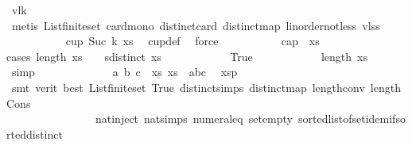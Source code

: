 \begin{isabellebody}
\ v{}l{\isacharunderscore}{\kern0pt}k\isanewline
\ \ \ \ \ \ \ \ \ \ \isamarkupfalse%
\ {\isacharparenleft}{\kern0pt}metis\ List{\isachardot}{\kern0pt}finite{\isacharunderscore}{\kern0pt}set\ card{\isacharunderscore}{\kern0pt}mono\ distinct{\isacharunderscore}{\kern0pt}card\ distinct{\isacharunderscore}{\kern0pt}map\ linorder{\isacharunderscore}{\kern0pt}not{\isacharunderscore}{\kern0pt}less\ v{}l{\isacharunderscore}{\kern0pt}ss{\isacharparenright}{\kern0pt}\isanewline
\ \ \ \ \ \ \ \ \isamarkupfalse%
\ {}{\isacharcolon}{\kern0pt}{\isachardoublequoteopen}{\isasymnot}\ cup\ {\isacharparenleft}{\kern0pt}Suc\ k{\isacharparenright}{\kern0pt}\ xs{\isachardoublequoteclose}\ \isamarkupfalse%
\ cup{\isacharunderscore}{\kern0pt}def\ \isamarkupfalse%
\ force\isanewline
\ \ \ \ \ \ \ \ \isamarkupfalse%
\ {\isachardoublequoteopen}{\isasymnot}\ cap\ {}\ xs{\isachardoublequoteclose}\isanewline
\ \ \ \ \ \ \ \ \isamarkupfalse%
{\isacharparenleft}{\kern0pt}cases\ {\isachardoublequoteopen}length\ xs\ {\isacharequal}{\kern0pt}\ {}\ {\isasymand}\ sdistinct\ xs{\isachardoublequoteclose}{\isacharparenright}{\kern0pt}\isanewline
\ \ \ \ \ \ \ \ \ \ \isamarkupfalse%
\ True\isanewline
\ \ \ \ \ \ \ \ \ \ \isamarkupfalse%
\ {\isachardoublequoteopen}length\ xs\ {\isacharequal}{\kern0pt}\ {}{\isachardoublequoteclose}\ \isamarkupfalse%
\ simp\isanewline
\ \ \ \ \ \ \ \ \ \ \isamarkupfalse%
\ \isamarkupfalse%
\ a\ b\ c\ \ xs{}{\isacharcolon}{\kern0pt}\ {\isachardoublequoteopen}xs\ {\isacharequal}{\kern0pt}\ {\isacharbrackleft}{\kern0pt}a{\isacharcomma}{\kern0pt}b{\isacharcomma}{\kern0pt}c{\isacharbrackright}{\kern0pt}{\isachardoublequoteclose}\ \isamarkupfalse%
\ xsp\isanewline
\ \ \ \ \ \ \ \ \ \ \ \ \isamarkupfalse%
\ {\isacharparenleft}{\kern0pt}smt\ {\isacharparenleft}{\kern0pt}verit{\isacharcomma}{\kern0pt}\ best{\isacharparenright}{\kern0pt}\ List{\isachardot}{\kern0pt}finite{\isacharunderscore}{\kern0pt}set\ True\ distinct{\isachardot}{\kern0pt}simps{\isacharparenleft}{\kern0pt}{}{\isacharparenright}{\kern0pt}\ distinct{\isacharunderscore}{\kern0pt}map\ length{\isacharunderscore}{\kern0pt}{}{\isacharunderscore}{\kern0pt}conv\ length{\isacharunderscore}{\kern0pt}Cons\isanewline
\ \ \ \ \ \ \ \ \ \ \ \ \ \ \ \ nat{\isachardot}{\kern0pt}inject\ nat{\isachardot}{\kern0pt}simps{\isacharparenleft}{\kern0pt}{}{\isacharparenright}{\kern0pt}\ numeral{\isacharunderscore}{\kern0pt}{}{\isacharunderscore}{\kern0pt}eq{\isacharunderscore}{\kern0pt}{}\ set{\isacharunderscore}{\kern0pt}empty\ sorted{\isacharunderscore}{\kern0pt}list{\isacharunderscore}{\kern0pt}of{\isacharunderscore}{\kern0pt}set{\isachardot}{\kern0pt}idem{\isacharunderscore}{\kern0pt}if{\isacharunderscore}{\kern0pt}sorted{\isacharunderscore}{\kern0pt}distinct\isanewline

\end{isabellebody}
